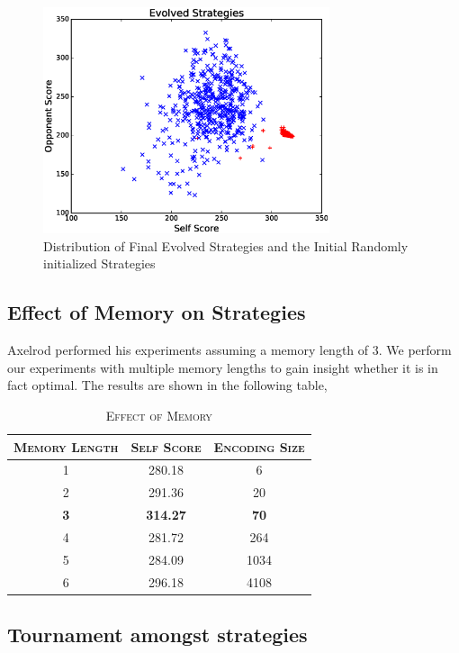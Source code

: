 \documentclass[a4paper]{article}
\begin{document}
	\begin{figure}[H]
	\centering
	\includegraphics[width=0.75\textwidth]{evolvePlot.eps}
	\caption{{Distribution of Final Evolved Strategies and the Initial Randomly initialized Strategies}}
	\end{figure}

	\subsection{Effect of Memory on Strategies}
	
	Axelrod performed his experiments assuming a memory length of 3. We perform our experiments with multiple memory lengths to gain insight whether it is in fact optimal. The results are shown in the following table,
	
	\begin{table}[H]
	  \begin{center}
	    \begin{tabular}{c|c|c}
	      \toprule
	      \textsc{Memory Length} & \textsc{Self Score} & \textsc{Encoding Size}\\
	      \midrule
	      1 & 280.18 & 6\\
		  2 & 291.36 & 20\\
		  \textbf{3} & \textbf{314.27} & \textbf{70}\\
		  4 & 281.72 & 264\\
		  5 & 284.09 & 1034\\
		  6 & 296.18 & 4108\\		  
		  \bottomrule
	    \end{tabular}
	    \caption{\textsc{Effect of Memory}}
	  \end{center}
	\end{table}  
	
	\subsection{Tournament amongst strategies}
\end{document}
